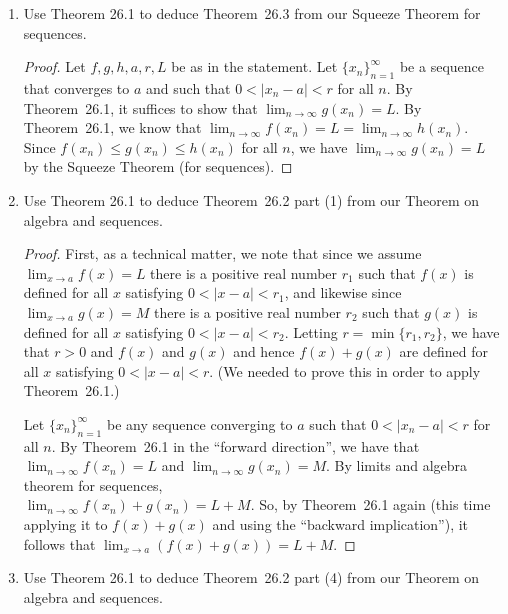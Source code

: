 \documentclass[12pt]{amsart}
\numberwithin{equation}{section}
\theoremstyle{plain} %
\theoremstyle{definition}
\theoremstyle{remark}
\begin{document}
\begin{enumerate}
\item Use Theorem 26.1 to deduce Theorem~26.3 from our Squeeze Theorem for sequences.

\begin{framed}
	\begin{proof}
		Let $f,g,h,a,r,L$ be as in the statement. Let $\{x_n\}_{n=1}^\infty$ be a sequence that converges to $a$ and such that $0<|x_n-a|<r$ for all $n$. By Theorem~26.1, it suffices to show that $\lim_{n \to \infty} g(x_n) = L$. By Theorem~26.1, we know that $\lim_{n \to \infty} f(x_n) = L=\lim_{n \to \infty} h(x_n)$. Since $f(x_n)\leq g(x_n) \leq h(x_n)$ for all $n$, we have $\lim_{n \to \infty} g(x_n) = L$ by the Squeeze Theorem (for sequences).
		\end{proof}
\end{framed}

\item Use Theorem 26.1 to deduce Theorem~26.2 part (1) from our Theorem on algebra and sequences.

\begin{framed}
\begin{proof}
First, as a technical matter, we note that since we assume
	${\lim_{x \to a} f(x) = L}$ there is a positive real number $r_1$ such that $f(x)$ is defined for all $x$ satisfying $0 < |x-a| < r_1$,
	and likewise since
	$\lim_{x \to a} g(x) = M$ there is a positive real number $r_2$ such that $g(x)$ is defined for all $x$ satisfying $0 < |x-a| < r_2$. Letting $r = \min\{r_1, r_2\}$,
	we have that $r > 0$ and $f(x)$ and $g(x)$ and hence $f(x) + g(x)$ are defined for all $x$ satisfying $0 < |x-a| < r$.  (We needed to prove this in order to apply Theorem~26.1.)
	
	
	Let $\{x_n\}_{n=1}^\infty$ be any sequence converging to $a$ such that  ${0 < |x_n -a| < r}$ for all $n$. 
	By  Theorem~26.1 in the ``forward direction'', we have that  $\lim_{n \to \infty} f(x_n) = L$ and $\lim_{n \to \infty} g(x_n) = M$. By limits and algebra theorem for sequences, \\
	${\lim_{n \to \infty} f(x_n) +g(x_n) = L + M}$. 
	So, by  Theorem~26.1 again (this time applying it to $f(x) + g(x)$ and using the ``backward
	implication''), it follows that
	$\lim_{x \to a} (f(x) + g(x)) = L + M$.
\end{proof}
\end{framed}


\item Use Theorem 26.1 to deduce Theorem~26.2 part (4) from our Theorem on algebra and sequences.





\end{enumerate}
\end{document}
